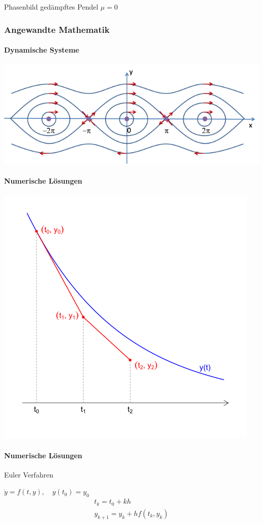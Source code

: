\documentclass{beamer}
\begin{document}
 \begin{frame}
    \begin{block}{Phasenbild gedämpftes Pendel}
    $\mu = 0$
    \frametitle{Angewandte Mathematik}
\framesubtitle{Dynamische Systeme }
\includegraphics[scale=0.9]{images/pendulum1}
    \end{block}
\end{frame}







 \begin{frame}
\framesubtitle{Numerische Lösungen}
\includegraphics[scale=0.6]{images/euler}

\end{frame}




 \begin{frame}
\framesubtitle{Numerische Lösungen}
    \begin{block}{Euler Verfahren}

$\dot{y}=f(t,y), \quad  y(t_0)=y_0$
\begin{align}
t_k=t_0+kh \\
y_{k+1}=y_k+hf(t_k,y_k)
\end{align}

    \end{block}
\end{frame}
\end{document}
